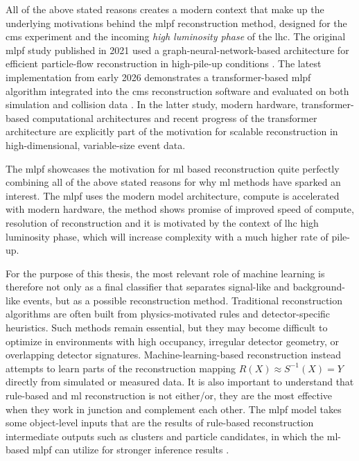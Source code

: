 All of the above stated reasons creates a modern context that make up the underlying motivations behind the \gls{mlpf} reconstruction method, designed for the \gls{cms} experiment and the incoming \textit{high luminosity phase} of the \gls{lhc}. The original \gls{mlpf} study published in 2021 used a graph-neural-network-based architecture for efficient particle-flow reconstruction in high-pile-up conditions \cite{pata2021-mlpf}. The latest implementation from early 2026 demonstrates a transformer-based \gls{mlpf} algorithm integrated into the \gls{cms} reconstruction software and evaluated on both simulation and collision data \cite{pata2026-mlpf}. In the latter study, modern hardware, transformer-based computational architectures and recent progress of  the transformer architecture are explicitly part of the motivation for scalable reconstruction in high-dimensional, variable-size event data.

The \gls{mlpf} showcases the motivation for \gls{ml} based reconstruction quite perfectly combining all of the above stated reasons for why \gls{ml} methods have sparked an interest. The \gls{mlpf} uses the modern model architecture, compute is accelerated with modern hardware, the method shows promise of improved speed of compute, resolution of reconstruction and it is motivated by the context of \gls{lhc} high luminosity phase, which will increase complexity with a much higher rate of pile-up.

For the purpose of this thesis, the most relevant role of machine learning is therefore not only as a final classifier that separates signal-like and background-like events, but as a possible reconstruction method. Traditional reconstruction algorithms are often built from physics-motivated rules and detector-specific heuristics. Such methods remain essential, but they may become difficult to optimize in environments with high occupancy, irregular detector geometry, or overlapping detector signatures. Machine-learning-based reconstruction instead attempts to learn parts of the reconstruction mapping $R(X) \approx S^{-1}(X) = Y$ directly from simulated or measured data. It is also important to understand that rule-based and \gls{ml} reconstruction is not either/or, they are the most effective when they work in junction and complement each other. The \gls{mlpf} model takes some object-level inputs that are the results of rule-based reconstruction intermediate outputs such as clusters and particle candidates, in which the \gls{ml}-based \gls{mlpf} can utilize for stronger inference results \cite{pata2021-mlpf}. 

